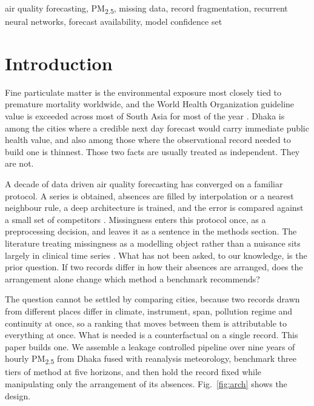 \documentclass[conference]{IEEEtran}
\begin{document}
\begin{IEEEkeywords}
air quality forecasting, PM\textsubscript{2.5}, missing data, record fragmentation,
recurrent neural networks, forecast availability, model confidence set
\end{IEEEkeywords}

\section{Introduction}

Fine particulate matter is the environmental exposure most closely tied to premature
mortality worldwide, and the World Health Organization guideline value is exceeded across
most of South Asia for most of the year \cite{who2021}. Dhaka is among the cities where a
credible next day forecast would carry immediate public health value, and also among those
where the observational record needed to build one is thinnest. Those two facts are usually
treated as independent. They are not.

A decade of data driven air quality forecasting has converged on a familiar protocol. A series
is obtained, absences are filled by interpolation or a nearest neighbour rule, a deep
architecture is trained, and the error is compared against a small set of competitors
\cite{li2017lstm, karnati2025}. Missingness enters this protocol once, as a preprocessing
decision, and leaves it as a sentence in the methods section. The literature treating
missingness as a modelling object rather than a nuisance sits largely in clinical time series
\cite{che2018grud}. What has not been asked, to our knowledge, is the prior question. If two
records differ in how their absences are arranged, does the arrangement alone change which
method a benchmark recommends?

The question cannot be settled by comparing cities, because two records drawn from different
places differ in climate, instrument, span, pollution regime and continuity at once, so a
ranking that moves between them is attributable to everything at once. What is needed is a
counterfactual on a single record. This paper builds one. We assemble a leakage controlled
pipeline over nine years of hourly PM\textsubscript{2.5} from Dhaka fused with reanalysis
meteorology, benchmark three tiers of method at five horizons, and then hold the record fixed
while manipulating only the arrangement of its absences. Fig.~\ref{fig:arch} shows the design.
\end{document}
